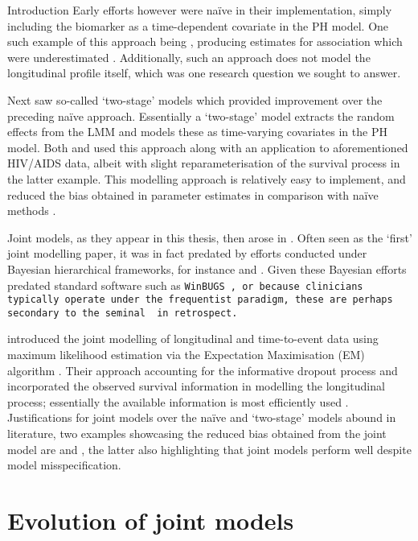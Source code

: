 \begin{chapter}{\label{cha:intro}Introduction}
  Early efforts however were na\"{i}ve in their implementation, simply including the biomarker as a time-dependent covariate in the PH model. One such example of this approach being \citet{Andersen1982}, producing estimates for association which were underestimated \citep{Prentice1982, Sweeting2011}. Additionally, such an approach does not model the longitudinal profile itself, which was one research question we sought to answer.

  Next saw so-called `two-stage' models which provided improvement over the preceding na\"{i}ve approach. Essentially a `two-stage' model extracts the random effects from the LMM and models these as time-varying covariates in the PH model. Both \citet{Tsiatis1995} and \citet{DeGruttola1994} used this approach along with an application to aforementioned HIV/AIDS data, albeit with slight reparameterisation of the survival process in the latter example. This modelling approach is relatively easy to implement, and reduced the bias obtained in parameter estimates in comparison with na\"{i}ve methods \citep{Dafni1998}.

  Joint models, as they appear in this thesis, then arose in \citet{Wulfsohn97}. Often seen as the  `first' joint modelling paper, it was in fact predated by efforts conducted under Bayesian hierarchical frameworks, for instance \citet{Berzuini1996} and \citet{Faucett1996}. Given these Bayesian efforts predated standard software such as \tt{WinBUGS} \citep{Winbugs-manual}, or because clinicians typically operate under the frequentist paradigm, these are perhaps secondary to the seminal \citet{Wulfsohn97} in retrospect.

  \citet{Wulfsohn97} introduced the joint modelling of longitudinal and time-to-event data using maximum likelihood estimation via the Expectation Maximisation (EM) algorithm \citep{Dempster77}. Their approach 
  accounting for the informative dropout process and incorporated the observed survival information in modelling the longitudinal process; essentially the available information is most efficiently used \citep{JMOverview}. Justifications for joint models over the na\"{i}ve and `two-stage' models abound in literature, two examples showcasing the reduced bias obtained from the joint model are \citet{Ibrahim2010} and \citet{Sweeting2011}, the latter also highlighting that joint models perform well despite model misspecification.

  \section{Evolution of joint models}\label{sec:intro-evolution-parent}

\end{chapter}
